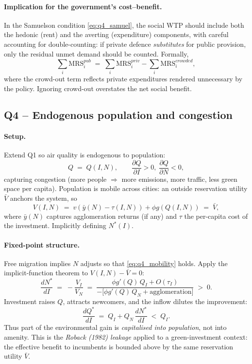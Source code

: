 \documentclass[11pt,a4paper]{article}
\begin{document}
\paragraph{Implication for the government's cost--benefit.}
In the Samuelson condition \eqref{eq:q4_samuel}, the social WTP should include both the hedonic (rent) and the averting (expenditure) components, with careful accounting for double-counting: if private defence \emph{substitutes} for public provision, only the residual unmet demand should be counted. Formally,
\[
\sum_{i}\mathrm{MRS}_{i}^{pub}\;=\;\sum_{i}\mathrm{MRS}_{i}^{priv}-\sum_{i}\mathrm{MRS}_{i}^{crowded},
\]
where the crowd-out term reflects private expenditures rendered unnecessary by the policy. Ignoring crowd-out overstates the net social benefit.

\subsection*{Q4 -- Endogenous population and congestion}

\paragraph{Setup.}
Extend Q1 so air quality is endogenous to population:
\begin{equation}
Q\;=\;Q(I,N),\qquad \frac{\partial Q}{\partial I}>0,\;\frac{\partial Q}{\partial N}<0,
\label{eq:q4_Q}
\end{equation}
capturing congestion (more people $\Rightarrow$ more emissions, more traffic, less green space per capita). Population is mobile across cities: an outside reservation utility $\bar V$ anchors the system, so
\begin{equation}
V(I,N)\;=\;v(\bar y(N)-\tau(I,N))+\phi g(Q(I,N))\;=\;\bar V,
\label{eq:q4_mobility}
\end{equation}
where $\bar y(N)$ captures agglomeration returns (if any) and $\tau$ the per-capita cost of the investment. Implicitly defining $N^{*}(I)$.

\paragraph{Fixed-point structure.}
Free migration implies $N$ adjusts so that \eqref{eq:q4_mobility} holds. Apply the implicit-function theorem to $V(I,N)-\bar V=0$:
\begin{equation}
\frac{dN^{*}}{dI}\;=\;-\frac{V_{I}}{V_{N}}\;=\;\frac{\phi g'(Q)\,Q_{I}+O(\tau_{I})}{-\bigl[\phi g'(Q)\,Q_{N}+\text{agglomeration}\bigr]}\;>\;0.
\label{eq:q4_dNdI}
\end{equation}
Investment raises $Q$, attracts newcomers, and the inflow dilutes the improvement:
\begin{equation}
\frac{dQ^{*}}{dI}\;=\;Q_{I}+Q_{N}\,\frac{dN^{*}}{dI}\;<\;Q_{I}.
\label{eq:q4_dQdI}
\end{equation}
Thus part of the environmental gain is \emph{capitalised into population}, not into amenity. This is the \emph{Roback (1982) leakage} applied to a green-investment context: the effective benefit to incumbents is bounded above by the same reservation utility $\bar V$.
\end{document}
